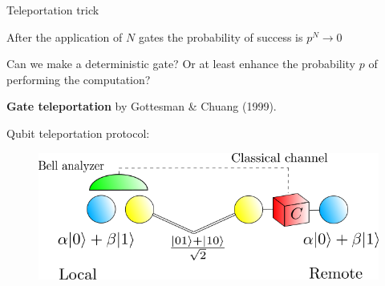 \documentclass{beamer}
\begin{document}
\begin{frame}{Teleportation trick}
\begin{center}

After the application of $N$ gates the probability of success is $p^{N}  \rightarrow 0$ \\

\begin{block}{}
\begin{center}
Can we make a deterministic gate? Or at least enhance the probability $p$ of performing the computation?
\end{center}
\end{block}

\vspace{10pt}

\textbf{Gate teleportation} by Gottesman \& Chuang (1999).

\end{center}
\end{frame}

\begin{frame}
\begin{center}

\begin{block}{}
\begin{center}
Qubit teleportation protocol:
\end{center}
\end{block}

\begin{figure}[!htb]
\centering
\includegraphics[scale=.60]{immagini/teleCartoon.png}
\end{figure}

\end{center}
\end{frame}
\end{document}
